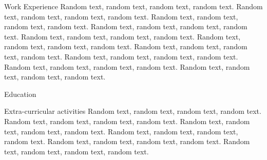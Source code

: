 \documentclass[purpleprocv]{procv}
\begin{document}
\begin{procv-twocolumns}
\begin{experience}{Work Experience}
{           Random text, random text, random text, random text.}
          {Random text, random text, random text, random text. Random text, random text, random text, random text.
           \newline
           Random text, random text, random text, random text.}
          {Random text, random text, random text, random text. Random text, random text, random text, random text.
           \newline
           Random text, random text, random text, random text.}
          {Random text, random text, random text, random text. Random text, random text, random text, random text.
           \newline
           Random text, random text, random text, random text.}
        \end{experience}
        \begin{experience}{Education}
        \end{experience}
        \begin{experience}{Extra-curricular activities}
          {Random text, random text, random text, random text. Random text, random text, random text, random text.}
          {Random text, random text, random text, random text. Random text, random text, random text, random text.
           \newline
           Random text, random text, random text, random text. Random text, random text, random text, random text.}
        \end{experience}
    \end{procv-twocolumns}
\end{document}
